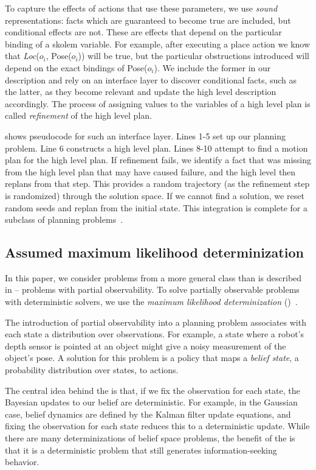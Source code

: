 To capture the effects of actions that use these parameters, we use
\emph{sound} representations: facts which are guaranteed to become
true are included, but conditional effects are not. These are effects
that depend on the particular binding of a skolem variable. For
example, after executing a place action we know that \emph{Loc}($o_i$,
Pose($o_i$)) will be true, but the particular obstructions introduced
will depend on the exact bindings of Pose($o_i$). We include the
former in our description and rely on an interface layer to discover
conditional facts, such as the latter, as they become relevant and update the high level
description accordingly. The process of assigning values to the variables
of a high level plan is called \emph{refinement} of the high level
plan.

 shows pseudocode for such an interface layer. Lines
1-5 set up our planning problem. Line 6 constructs a high level
plan. Lines 8-10 attempt to find a motion plan for the high level
plan. If refinement fails, we identify a fact that was missing from
the high level plan that may have caused failure, and the high level then
replans from that step. This provides a random trajectory (as the
refinement step is randomized) through the solution space. If we cannot
find a solution, we reset random seeds and replan from the initial
state. This integration is complete for a subclass of planning
problems~\cite{srivastava2014combined}.



\subsection{Assumed maximum likelihood determinization}
In this paper, we consider problems from a more general class than is
described in  -- problems with partial
observability. To solve partially observable problems with
deterministic solvers, we use the \emph{maximum
  likelihood determinization} (\mld)~\cite{platt2010belief}.

The introduction of partial observability into a planning problem
associates with each state a distribution over observations. For
example, a state where a robot's depth sensor is pointed at an object
might give a noisy measurement of the object's pose. A solution for
this problem is a policy that maps a \emph{belief state}, a
probability distribution over states, to actions.

The central idea behind the \mld{} is that, if we fix the observation
for each state, the Bayesian updates to our belief are
deterministic. For example, in the Gaussian case, belief dynamics are
defined by the Kalman filter update equations, and fixing the
observation for each state reduces this to a deterministic
update. While there are many determinizations of belief space
problems, the benefit of the \mld{} is that it is a deterministic
problem that still generates information-seeking behavior.

